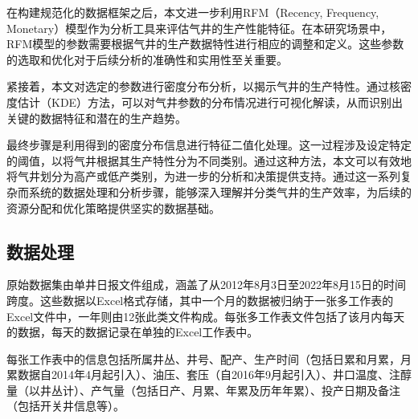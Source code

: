 在构建规范化的数据框架之后，本文进一步利用RFM（Recency, Frequency, Monetary）模型作为分析工具来评估气井的生产性能特征。在本研究场景中，RFM模型的参数需要根据气井的生产数据特性进行相应的调整和定义。这些参数的选取和优化对于后续分析的准确性和实用性至关重要。

紧接着，本文对选定的参数进行密度分布分析，以揭示气井的生产特性。通过核密度估计（KDE）方法，可以对气井参数的分布情况进行可视化解读，从而识别出关键的数据特征和潜在的生产趋势。

最终步骤是利用得到的密度分布信息进行特征二值化处理。这一过程涉及设定特定的阈值，以将气井根据其生产特性分为不同类别。通过这种方法，本文可以有效地将气井划分为高产或低产类别，为进一步的分析和决策提供支持。通过这一系列复杂而系统的数据处理和分析步骤，能够深入理解并分类气井的生产效率，为后续的资源分配和优化策略提供坚实的数据基础。
\subsection{数据处理}
\label{cha:data}
原始数据集由单井日报文件组成，涵盖了从2012年8月3日至2022年8月15日的时间跨度。这些数据以Excel格式存储，其中一个月的数据被归纳于一张多工作表的Excel文件中，一年则由12张此类文件构成。每张多工作表文件包括了该月内每天的数据，每天的数据记录在单独的Excel工作表中。

每张工作表中的信息包括所属井丛、井号、配产、生产时间（包括日累和月累，月累数据自2014年4月起引入）、油压、套压（自2016年9月起引入）、井口温度、注醇量（以井丛计）、产气量（包括日产、月累、年累及历年年累）、投产日期及备注（包括开关井信息等）。

